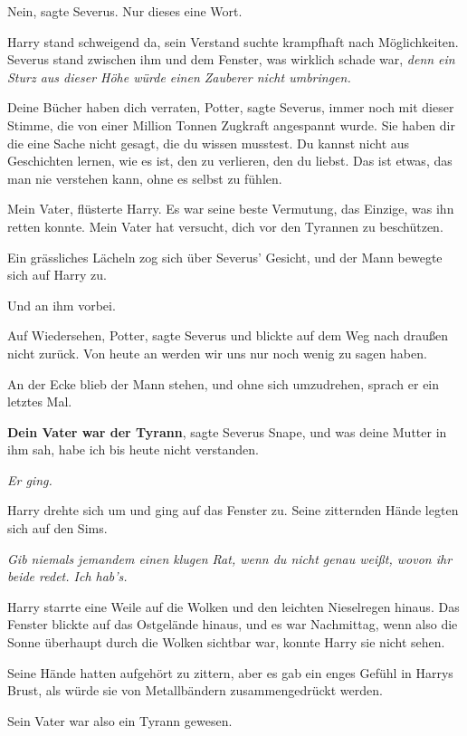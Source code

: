 \glqq{}Nein\grqq{}, sagte Severus. Nur dieses eine Wort.

Harry stand schweigend da, sein Verstand suchte krampfhaft nach Möglichkeiten.
Severus stand zwischen ihm und dem Fenster, was wirklich schade war, \emph{denn
ein Sturz aus dieser Höhe würde einen Zauberer nicht umbringen.}

\glqq{}Deine Bücher haben dich verraten, Potter\grqq{}, sagte Severus, immer
noch mit dieser Stimme, die von einer Million Tonnen Zugkraft angespannt wurde.
\glqq{}Sie haben dir die eine Sache nicht gesagt, die du wissen musstest. Du
kannst nicht aus Geschichten lernen, wie es ist, den zu verlieren, den du
liebst. Das ist etwas, das man nie verstehen kann, ohne es selbst zu
fühlen.\grqq{}

\glqq{}Mein Vater\grqq{}, flüsterte Harry. Es war seine beste Vermutung, das
Einzige, was ihn retten konnte. \glqq{}Mein Vater hat versucht, dich vor den
Tyrannen zu beschützen.\grqq{}

Ein grässliches Lächeln zog sich über Severus' Gesicht, und der Mann bewegte
sich auf Harry zu.

Und an ihm vorbei.

\glqq{}Auf Wiedersehen, Potter\grqq{}, sagte Severus und blickte auf dem Weg
nach draußen nicht zurück. \glqq{}Von heute an werden wir uns nur noch wenig zu
sagen haben.\grqq{}

An der Ecke blieb der Mann stehen, und ohne sich umzudrehen, sprach er ein
letztes Mal.

\glqq{}
\textbf{Dein Vater war der Tyrann}\grqq{}, sagte Severus Snape, \glqq{}und was
deine Mutter in ihm sah, habe ich bis heute nicht verstanden.\grqq{}

\emph{Er ging.}

Harry drehte sich um und ging auf das Fenster zu. Seine zitternden Hände legten
sich auf den Sims.

\emph{Gib niemals jemandem einen klugen Rat, wenn du nicht genau weißt, wovon
ihr beide redet. Ich hab's.}

Harry starrte eine Weile auf die Wolken und den leichten Nieselregen hinaus. Das
Fenster blickte auf das Ostgelände hinaus, und es war Nachmittag, wenn also die
Sonne überhaupt durch die Wolken sichtbar war, konnte Harry sie nicht sehen.

Seine Hände hatten aufgehört zu zittern, aber es gab ein enges Gefühl in Harrys
Brust, als würde sie von Metallbändern zusammengedrückt werden.

Sein Vater war also ein Tyrann gewesen.


